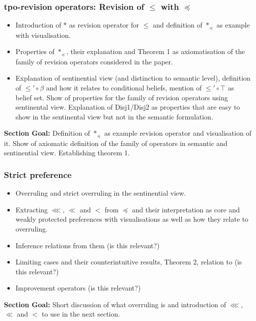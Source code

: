 \documentclass[11pt]{article}
\begin{document}
\subsubsection{tpo-revision operators: Revision of $\leq$ with $\preceq$}
\begin{itemize}
    \item Introduction of $\ast$ as revision operator for $\leq$ and definition of $\ast_{\preceq}$ as example with visualisation.
    \item Properties of $\ast_{\preceq}$, their explanation and Theorem 1 as axiomatisation of the family of revision operators considered in the paper.
    \item Explanation of sentinential view (and distinction to semantic level), definition of $\leq' \circ \beta $ and how it relates to conditional beliefs, mention of $\leq' \circ \top $ as belief set. Show of properties for the family of revision operators using sentinental view. Explanation of Disj1/Disj2 as properties that are easy to show in the sentinental view but not in the semantic formulation.
\end{itemize}
\textbf{Section Goal:} Definition of $\ast_{\preceq}$ as example revision operator and visualisation of it. Show of axiomatic definition of the family of operators in semantic and sentinential view. Establishing theorem 1.

\subsubsection{Strict preference}
\begin{itemize}
    \item Overruling and strict overruling in the sentinential view.
    \item Extracting $\lll$, $\ll$ and $<$ from $\preceq$ and their interpretation as core and weakly protected preferences with visualisations as well as how they relate to overruling.
    \item Inference relations from them (is this relevant?)
    \item Limiting cases and their counterintuitive results, Theorem 2, relation to \cite{Darwiche1997} (is this relevant?)
    \item Improvement operators (is this relevant?)
\end{itemize}
\textbf{Section Goal:} Short discussion of what overruling is and introduction of $\lll$, $\ll$ and $<$ to use in the next section.
\end{document}
